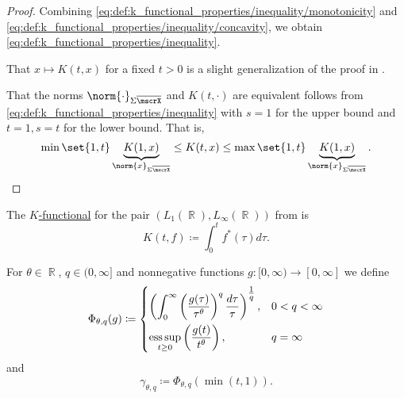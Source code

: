 \begin{proof}
  Combining \eqref{eq:def:k_functional_properties/inequality/monotonicity} and \eqref{eq:def:k_functional_properties/inequality/concavity}, we obtain \eqref{eq:def:k_functional_properties/inequality}.

   That \( x \mapsto K(t, x) \) for a fixed \( t > 0 \) is a slight generalization of the proof in .

  That the norms \( \norm{\cdot}_{\Sigma \overline{\mscrX}} \) and \( K(t, \cdot) \) are equivalent follows from \eqref{eq:def:k_functional_properties/inequality} with \( s = 1 \) for the upper bound and \( t = 1, s = t \) for the lower bound. That is,
  \begin{equation*}
    \min\set{1, t} \underbrace{K(1, x)}_{\norm{x}_{\Sigma \overline{\mscrX}}} \leq K(t, x) \leq \max\set{1, t} \underbrace{K(1, x)}_{\norm{x}_{\Sigma \overline{\mscrX}}}.
  \end{equation*}
\end{proof}

\begin{example}\label{thm:lp_interpolation_spaces/k_functional}
  The \hyperref[def:k_functional]{\( K \)-functional} for the pair \( (L_1(\BbbR), L_\infty(\BbbR)) \) from  is
  \begin{equation*}
    K(t, f) \coloneqq \int_0^t f^*(\tau) d\tau.
  \end{equation*}
\end{example}

\begin{definition}\label{def:lorenz_quasinorm}
  For \( \theta \in \BbbR \), \( q \in (0, \infty] \) and nonnegative functions \( g: [0, \infty) \to [0, \infty] \) we define
  \begin{equation}\label{eq:def:lorenz_quasinorm}
    \Phi_{\theta,q}(g) \coloneqq \begin{dcases}
      \left( \int_0^\infty \left( \frac {g(\tau)} {\tau^\theta} \right)^q \frac {d\tau} \tau \right)^{\tfrac 1 q}, &0 < q < \infty \\
      \operatorname*{ess\sup}_{t \geq 0} \left( \frac {g(t)} {t^\theta} \right),                                                &q = \infty
    \end{dcases}
  \end{equation}
  and
  \begin{equation}\label{eq:def:lorenz_quasinorm/gamma}
    \gamma_{\theta,q} \coloneqq \Phi_{\theta,q}(\min(t, 1)).
  \end{equation}
\end{definition}

